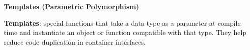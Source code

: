 \documentclass[6.6pt, twocolumn]{extarticle}
\newcommand{\crossno}{\textcolor{false-red}{\faTimes} No}
\newcommand{\checkyes}{\textcolor{true-green}{\faCheck} Yes}
\newcommand{\graycell}{\cellcolor{gray!15}}
\newcommand{\bigO}[1]{$\mathrm{O}{(#1)}$}
\newcommand{\myinline}[1]{\lstinline[basicstyle={\fontsize{5pt}{6}\ttfamily}]{#1}}
\begin{document}
\smallskip



\smallskip

\textcolor{headcolor}{\textbf{Templates (Parametric Polymorphism)}}

\textbf{Templates}: special functions that take a data type as a parameter at compile time and instantiate an object or function compatible with that type. They help reduce code duplication in container interfaces.
\end{document}
